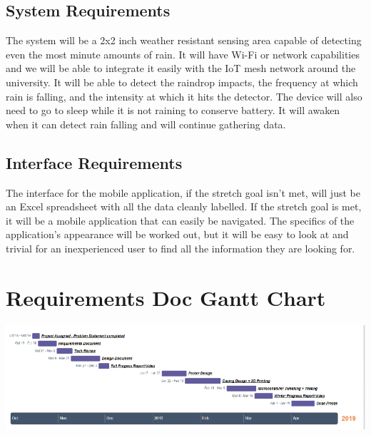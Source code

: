 \documentclass[letterpaper,10pt,draftclsnofoot,onecolumn]{article}
\begin{document}
\subsection{System Requirements}
The system will be a 2x2 inch weather resistant sensing area capable of detecting even the most minute amounts of rain. It will have Wi-Fi or network capabilities and we will be able to integrate it easily with the IoT mesh network around the university. It will be able to detect the raindrop impacts, the frequency at which rain is falling, and the intensity at which it hits the detector. The device will also need to go to sleep while it is not raining to conserve battery. It will awaken when it can detect rain falling and will continue gathering data.

\subsection{Interface Requirements}
The interface for the mobile application, if the stretch goal isn't met, will just be an Excel spreadsheet with all the data cleanly labelled. If the stretch goal is met, it will be a mobile application that can easily be navigated. The specifics of the application's appearance will be worked out, but it will be easy to look at and trivial for an inexperienced user to find all the information they are looking for.

\section{Requirements Doc Gantt Chart}

\includegraphics[width=1.0\textwidth]{GanttChartFinal.eps}
\end{document}
